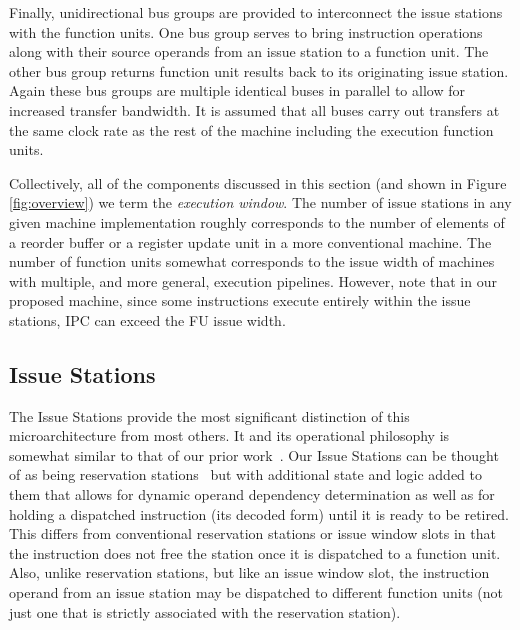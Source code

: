 \documentclass[10pt,dvips]{article}
\begin{document}
Finally, unidirectional bus groups are provided to interconnect
the issue stations with the function units.
One bus group serves to bring instruction
operations along with their source operands from an issue
station to a function unit.
The other bus group returns function unit results back to its
originating issue station.
Again these bus groups are multiple identical buses in
parallel to allow for increased transfer bandwidth.
It is assumed that all buses carry out transfers at the same
clock rate as the rest of the machine including the execution
function units.

Collectively, all of the components discussed in this section
(and shown in 
Figure \ref{fig:overview}) we term the \textit{execution window}.
The number of issue stations in
any given machine implementation roughly corresponds to the
number of elements of a reorder buffer or a register update unit
in a more conventional machine.
The number of function units somewhat corresponds to the
issue width of machines with multiple, and more general, execution pipelines.
However, note that in our proposed machine, since some instructions
execute entirely within the issue stations, IPC can exceed the FU
issue width.
%
\subsection{Issue Stations}
%
The Issue Stations provide the most significant distinction of this
microarchitecture from most others.  It and its operational philosophy
is somewhat similar to that of our prior work~\cite{undisclosed1}.
Our Issue Stations can be thought of as being 
reservation stations~\cite{Tom67} but
with additional state and logic added to them that allows
for dynamic operand dependency determination as well as
for holding a dispatched instruction (its decoded form) 
until it is ready to be
retired.  This differs from conventional reservation stations
or issue window slots in that the instruction does not free
the station once it is dispatched to a function unit.
Also, unlike reservation stations, but like an issue window slot,
the instruction operand from an issue station may be dispatched
to different function units (not just one that is strictly
associated with the reservation station).
\end{document}
